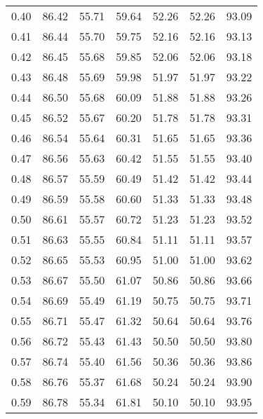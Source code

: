 \begin{tabular}{|c|c|c|c|c|c|c|}
      0.40 &     86.42 &     55.71 &      59.64 &   52.26 &      52.26 &         93.09 \\
      0.41 &     86.44 &     55.70 &      59.75 &   52.16 &      52.16 &         93.13 \\
      0.42 &     86.45 &     55.68 &      59.85 &   52.06 &      52.06 &         93.18 \\
      0.43 &     86.48 &     55.69 &      59.98 &   51.97 &      51.97 &         93.22 \\
      0.44 &     86.50 &     55.68 &      60.09 &   51.88 &      51.88 &         93.26 \\
      0.45 &     86.52 &     55.67 &      60.20 &   51.78 &      51.78 &         93.31 \\
      0.46 &     86.54 &     55.64 &      60.31 &   51.65 &      51.65 &         93.36 \\
      0.47 &     86.56 &     55.63 &      60.42 &   51.55 &      51.55 &         93.40 \\
      0.48 &     86.57 &     55.59 &      60.49 &   51.42 &      51.42 &         93.44 \\
      0.49 &     86.59 &     55.58 &      60.60 &   51.33 &      51.33 &         93.48 \\
      0.50 &     86.61 &     55.57 &      60.72 &   51.23 &      51.23 &         93.52 \\
      0.51 &     86.63 &     55.55 &      60.84 &   51.11 &      51.11 &         93.57 \\
      0.52 &     86.65 &     55.53 &      60.95 &   51.00 &      51.00 &         93.62 \\
      0.53 &     86.67 &     55.50 &      61.07 &   50.86 &      50.86 &         93.66 \\
      0.54 &     86.69 &     55.49 &      61.19 &   50.75 &      50.75 &         93.71 \\
      0.55 &     86.71 &     55.47 &      61.32 &   50.64 &      50.64 &         93.76 \\
      0.56 &     86.72 &     55.43 &      61.43 &   50.50 &      50.50 &         93.80 \\
      0.57 &     86.74 &     55.40 &      61.56 &   50.36 &      50.36 &         93.86 \\
      0.58 &     86.76 &     55.37 &      61.68 &   50.24 &      50.24 &         93.90 \\
      0.59 &     86.78 &     55.34 &      61.81 &   50.10 &      50.10 &         93.95 \\

\end{tabular}
